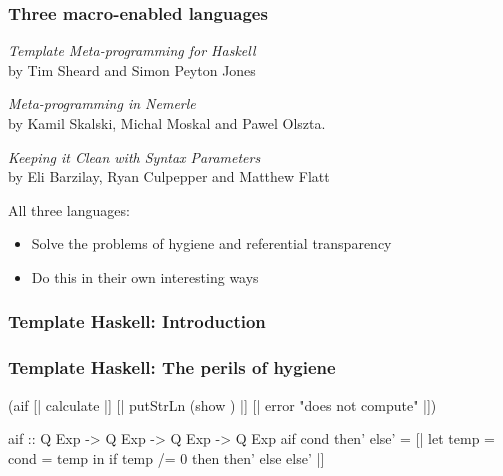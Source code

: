 \documentclass[hyperref={bookmarks=false}]{beamer}
\begin{document}
\begin{frame}[fragile]
\frametitle{Three macro-enabled languages}

\emph{Template Meta-programming for Haskell} \text{\color{blue}{[Template Haskell]}}\\
by Tim Sheard and Simon Peyton Jones

\vskip15pt

\emph{Meta-programming in Nemerle} \text{\color{blue}{[Nemerle]}}\\
by Kamil Skalski, Michal Moskal and Pawel Olszta.

\vskip15pt

\emph{Keeping it Clean with Syntax Parameters} \text{\color{blue}{[Racket]}}\\
by Eli Barzilay, Ryan Culpepper and Matthew Flatt

\vskip15pt

All three languages:
\begin{itemize}
\item Solve the problems of hygiene and referential transparency
\item Do this in their own interesting ways
\end{itemize}
\end{frame}

\begin{frame}[fragile]
\frametitle<1>{Template Haskell: Introduction}
\frametitle<2>{Template Haskell: The perils of hygiene}
\begin{semiverbatim}
{\textdollar}(aif [| calculate |]
  [| putStrLn (show ) |]
  [| error "does not compute" |])

aif :: Q Exp -> Q Exp -> Q Exp -> Q Exp
aif cond then' else' =
  [| let temp = {\textdollar}cond
          = temp
     in if temp /= 0 then {\textdollar}then' else {\textdollar}else' |]
\end{semiverbatim}

\end{frame}
\end{document}

